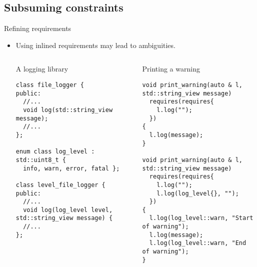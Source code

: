 \subsection{Subsuming constraints}

\begin{frame}[t,fragile]{Refining requirements}
\begin{itemize}
  \item Using inlined requirements may lead to ambiguities.

\begin{columns}[T]

\begin{block}{A logging library}
\begin{lstlisting}[basicstyle=\tiny]
class file_logger {
public:
  //...
  void log(std::string_view message);
  //...
};

enum class log_level : std::uint8_t { 
  info, warn, error, fatal };

class level_file_logger {
public:
  //...
  void log(log_level level, std::string_view message) {
  //...
};
\end{lstlisting}
\end{block}

\begin{block}{Printing a warning}
\begin{lstlisting}[basicstyle=\tiny]
void print_warning(auto & l, std::string_view message)
  requires(requires{
    l.log("");
  })
{
  l.log(message);
}

void print_warning(auto & l, std::string_view message)
  requires(requires{
    l.log("");
    l.log(log_level{}, "");
  })
{
  l.log(log_level::warn, "Start of warning");
  l.log(message);
  l.log(log_level::warn, "End of warning");
}
\end{lstlisting}
\end{block}

\end{columns}

\end{itemize}
\end{frame}

